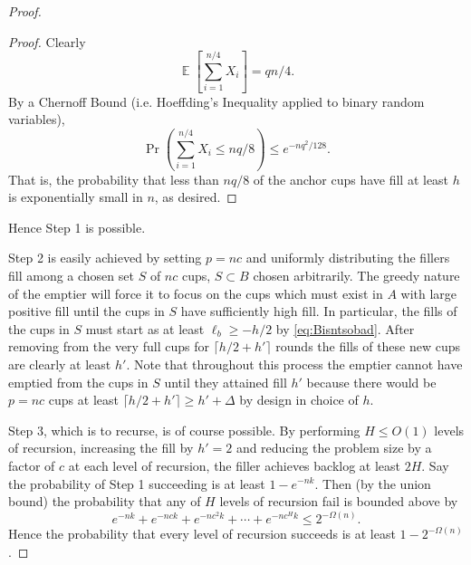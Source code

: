 \documentclass[twocolumn]{article}[10pt]
\DeclareMathOperator{\E}{\mathbb{E}}
\begin{document}
\begin{proof}
\begin{proof}
  Clearly $$\E\left[\sum_{i=1}^{n/4} X_i\right] = qn/4.$$ 
  By a Chernoff Bound (i.e. Hoeffding's Inequality applied to binary random variables),
  $$\Pr\left(\sum_{i=1}^{n/4} X_i\le nq/8\right) \le e^{-nq^2/128}.$$ That is, the
  probability that less than $nq/8$ of the anchor cups have fill at least $h$ is
  exponentially small in $n$, as desired.

\end{proof}

Hence Step 1 is possible.

Step 2 is easily achieved by setting $p=nc$ and uniformly distributing the
fillers fill among a chosen set $S$ of $nc$ cups, $S\subset B$ chosen
arbitrarily. The greedy nature of the emptier will force it to focus on the
cups which must exist in $A$ with large positive fill until the cups in $S$
have sufficiently high fill. In particular, the fills of the cups in $S$ must
start as at least $\ell_b \ge -h/2$ by \eqref{eq:Bisntsobad}.
After removing from the very full cups for $\lceil h/2+h' \rceil$ rounds the
fills of these new cups are clearly at least $h'$. Note that throughout this
process the emptier cannot have emptied from the cups in $S$ until they
attained fill $h'$ because there would be $p=nc$ cups at least $\lceil h/2+h'
\rceil \ge h' + \Delta$ by design in choice of $h$.

Step 3, which is to recurse, is of course possible. 
By performing $H\le O(1)$ levels of recursion, increasing the fill by $h' = 2$ and
reducing the problem size by a factor of $c$ at each
level of recursion, the filler achieves backlog at least $2H$. 
Say the probability of Step 1 succeeding is at least
$1-e^{-nk}$. Then (by the union bound) the probability that any of $H$ levels of
recursion fail is bounded above by 
$$e^{-nk} + e^{-nck} + e^{-nc^2 k} + \cdots + e^{-nc^H k} \le 2^{-\Omega(n)}.$$
Hence the probability that every level of recursion succeeds is at least $1-2^{-\Omega(n)}$.

\end{proof}
\end{document}

